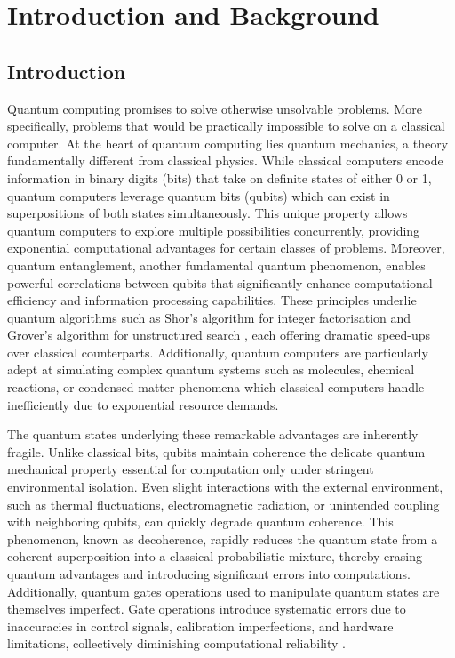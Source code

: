 \chapter{Introduction and Background} \label{Chap2}

\section{Introduction}
Quantum computing promises to solve otherwise unsolvable problems. More specifically, problems that would be practically impossible to solve on a classical computer. At the heart of quantum computing lies quantum mechanics, a theory fundamentally different from classical physics. While classical computers encode information in binary digits (bits) that take on definite states of either 0 or 1, quantum computers leverage quantum bits (qubits) which can exist in superpositions of both states simultaneously. This unique property allows quantum computers to explore multiple possibilities concurrently, providing exponential computational advantages for certain classes of problems. Moreover, quantum entanglement, another fundamental quantum phenomenon, enables powerful correlations between qubits that significantly enhance computational efficiency and information processing capabilities. These principles underlie quantum algorithms such as Shor's algorithm for integer factorisation \cite{365700} and Grover's algorithm for unstructured search \cite{10.1145/237814.237866}, each offering dramatic speed-ups over classical counterparts. Additionally, quantum computers are particularly adept at simulating complex quantum systems such as molecules, chemical reactions, or condensed matter phenomena which classical computers handle inefficiently due to exponential resource demands. 

The quantum states underlying these remarkable advantages are inherently fragile. Unlike classical bits, qubits maintain coherence the delicate quantum mechanical property essential for computation only under stringent environmental isolation. Even slight interactions with the external environment, such as thermal fluctuations, electromagnetic radiation, or unintended coupling with neighboring qubits, can quickly degrade quantum coherence. This phenomenon, known as decoherence, rapidly reduces the quantum state from a coherent superposition into a classical probabilistic mixture, thereby erasing quantum advantages and introducing significant errors into computations. Additionally, quantum gates operations used to manipulate quantum states are themselves imperfect. Gate operations introduce systematic errors due to inaccuracies in control signals, calibration imperfections, and hardware limitations, collectively diminishing computational reliability \cite{bultrini2020simplemitigationstrategysystematic}.

